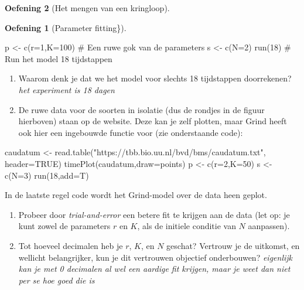 \documentclass[
  a4paper,
]{scrbook}
\newenvironment{Shaded}{\begin{snugshade}}{\end{snugshade}}
\newcommand{\AttributeTok}[1]{\textcolor[rgb]{0.40,0.45,0.13}{#1}}
\newcommand{\CommentTok}[1]{\textcolor[rgb]{0.37,0.37,0.37}{#1}}
\newcommand{\ConstantTok}[1]{\textcolor[rgb]{0.56,0.35,0.01}{#1}}
\newcommand{\DecValTok}[1]{\textcolor[rgb]{0.68,0.00,0.00}{#1}}
\newcommand{\FunctionTok}[1]{\textcolor[rgb]{0.28,0.35,0.67}{#1}}
\newcommand{\NormalTok}[1]{\textcolor[rgb]{0.00,0.23,0.31}{#1}}
\newcommand{\OtherTok}[1]{\textcolor[rgb]{0.00,0.23,0.31}{#1}}
\newcommand{\StringTok}[1]{\textcolor[rgb]{0.13,0.47,0.30}{#1}}
\providecommand{\tightlist}{%
  \setlength{\itemsep}{0pt}\setlength{\parskip}{0pt}}\usepackage{longtable,booktabs,array}
\theoremstyle{definition}
\newtheorem{exercise}{Oefening}[chapter]
\theoremstyle{remark}
\begin{document}
\begin{exercise}[Het mengen van een
kringloop]
\begin{exercise}[Parameter
fitting\}]
\begin{Shaded}
\begin{Highlighting}[]
\NormalTok{p }\OtherTok{\textless{}{-}} \FunctionTok{c}\NormalTok{(}\AttributeTok{r=}\DecValTok{1}\NormalTok{,}\AttributeTok{K=}\DecValTok{100}\NormalTok{)    }\CommentTok{\# Een ruwe gok van de parameters}
\NormalTok{s }\OtherTok{\textless{}{-}} \FunctionTok{c}\NormalTok{(}\AttributeTok{N=}\DecValTok{2}\NormalTok{)}
\FunctionTok{run}\NormalTok{(}\DecValTok{18}\NormalTok{)              }\CommentTok{\# Run het model 18 tijdstappen}
\end{Highlighting}
\end{Shaded}

\begin{enumerate}
\def\labelenumi{\alph{enumi}.}
\tightlist
\item
  Waarom denk je dat we het model voor slechts 18 tijdstappen
  doorrekenen? \emph{het experiment is 18 dagen}
\item
  De ruwe data voor de soorten in isolatie (dus de rondjes in de figuur
  hierboven) staan op de website. Deze kan je zelf plotten, maar Grind
  heeft ook hier een ingebouwde functie voor (zie onderstaande code):
\end{enumerate}

\begin{Shaded}
\begin{Highlighting}[]
\NormalTok{  caudatum }\OtherTok{\textless{}{-}} \FunctionTok{read.table}\NormalTok{(}\StringTok{"https://tbb.bio.uu.nl/bvd/bms/caudatum.txt"}\NormalTok{, }\AttributeTok{header=}\ConstantTok{TRUE}\NormalTok{)}
  \FunctionTok{timePlot}\NormalTok{(caudatum,}\AttributeTok{draw=}\NormalTok{points)}
\NormalTok{  p }\OtherTok{\textless{}{-}} \FunctionTok{c}\NormalTok{(}\AttributeTok{r=}\DecValTok{2}\NormalTok{,}\AttributeTok{K=}\DecValTok{50}\NormalTok{)   }
\NormalTok{  s }\OtherTok{\textless{}{-}} \FunctionTok{c}\NormalTok{(}\AttributeTok{N=}\DecValTok{3}\NormalTok{)}
  \FunctionTok{run}\NormalTok{(}\DecValTok{18}\NormalTok{,}\AttributeTok{add=}\NormalTok{T)}
\end{Highlighting}
\end{Shaded}

In de laatste regel code wordt het Grind-model over de data heen geplot.

\begin{enumerate}
\def\labelenumi{\alph{enumi}.}
\setcounter{enumi}{2}
\tightlist
\item
  Probeer door \emph{trial-and-error} een betere fit te krijgen aan de
  data (let op: je kunt zowel de parameters \(r\) en \(K\), als de
  initiele conditie van \(N\) aanpassen).
\item
  Tot hoeveel decimalen heb je \(r\), \(K\), en \(N\) geschat? Vertrouw
  je de uitkomst, en wellicht belangrijker, kun je dit vertrouwen
  objectief onderbouwen? \emph{eigenlijk kan je met 0 decimalen al wel
  een aardige fit krijgen, maar je weet dan niet per se hoe goed die is}
\end{enumerate}


\end{exercise}
\end{exercise}
\end{document}
